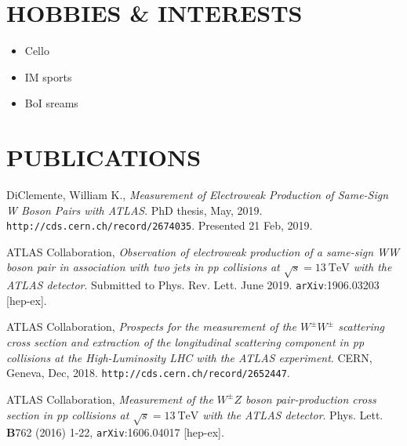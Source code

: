 \documentclass{res}
\begin{document}
\begin{resume}
\section{HOBBIES \& INTERESTS}
  \begin{itemize}
    \item Cello
    \item IM sports
    \item BoI sreams
  \end{itemize}

\section{PUBLICATIONS}
    DiClemente, William K., {\it Measurement of Electroweak Production of Same-Sign W Boson Pairs with ATLAS}.  PhD thesis, May, 2019. {\tt http://cds.cern.ch/record/2674035}. Presented 21 Feb, 2019.

    ATLAS Collaboration, {\it Observation of electroweak production of a same-sign WW boson pair in association with two jets in pp collisions at $\sqrt{s}=13~\textrm{TeV}$ with the ATLAS detector}. Submitted to Phys. Rev. Lett. June 2019. {\tt arXiv}:1906.03203 [hep-ex].

    ATLAS Collaboration, {\it Prospects for the measurement of the $W^{\pm}W^{\pm}$ scattering cross section and extraction of the longitudinal scattering component in pp collisions at the High-Luminosity LHC with the ATLAS experiment}. CERN, Geneva, Dec, 2018. {\tt http://cds.cern.ch/record/2652447}. %

    ATLAS Collaboration, {\it Measurement of the $W^{\pm}Z$ boson pair-production cross section in pp collisions at $\sqrt{s}=13~\textrm{TeV}$ with the ATLAS detector}. Phys. Lett. {\bf B}762 (2016) 1-22, {\tt arXiv}:1606.04017 [hep-ex].
 
 
 
\end{resume}
\end{document}
